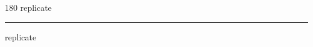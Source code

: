 
\begin{frame}
\begin{center}
\begin{turn}{180}
{\fontsize{2.5cm}{1em}\selectfont replicate}
\end{turn}
\vspace{1em}\par  
\hrule
\vspace{1em}\par  
{\fontsize{2.5cm}{1em}\selectfont replicate}
\end{center}
\end{frame}
